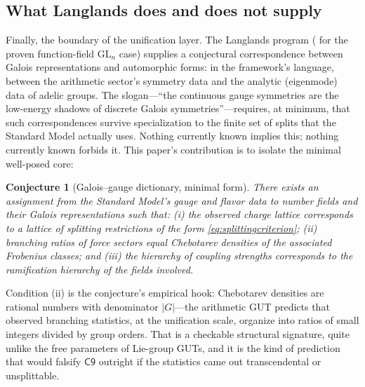 \documentclass[11pt,a4paper]{article}
\theoremstyle{plain}
\newtheorem{conjecture}{Conjecture}[section]
\theoremstyle{definition}
\theoremstyle{remark}
\begin{document}
\subsection{What Langlands does and does not supply}

Finally, the boundary of the unification layer. The Langlands program
(\cite{lafforgue2002} for the proven function-field $\mathrm{GL}_{n}$ case) supplies a
conjectural correspondence between Galois representations and automorphic forms: in the
framework's language, between the arithmetic sector's symmetry data and the analytic
(eigenmode) data of adelic groups. The slogan---``the continuous gauge symmetries
are the low-energy shadows of discrete Galois symmetries''---requires, at minimum, that
such correspondences survive specialization to the finite set of splits that the Standard
Model actually uses. Nothing currently known implies this; nothing currently known forbids
it. This paper's contribution is to isolate the minimal well-posed core:

\begin{conjecture}[Galois--gauge dictionary, minimal form]\label{conj:gut}
There exists an assignment from the Standard Model's gauge and flavor data to number fields
and their Galois representations such that: (i) the observed charge lattice corresponds to a
lattice of splitting restrictions of the form \eqref{eq:splittingcriterion}; (ii) branching
ratios of force sectors equal Chebotarev densities of the associated Frobenius classes; and
(iii) the hierarchy of coupling strengths corresponds to the ramification hierarchy of the
fields involved.
\end{conjecture}

Condition (ii) is the conjecture's empirical hook: Chebotarev densities are rational
numbers with denominator $|G|$---the arithmetic GUT predicts that observed branching
statistics, at the unification scale, organize into ratios of small integers divided by
group orders. That is a checkable structural signature, quite unlike the free parameters of
Lie-group GUTs, and it is the kind of prediction that would falsify $\mathsf{C9}$ outright
if the statistics came out transcendental or unsplittable.
\end{document}
